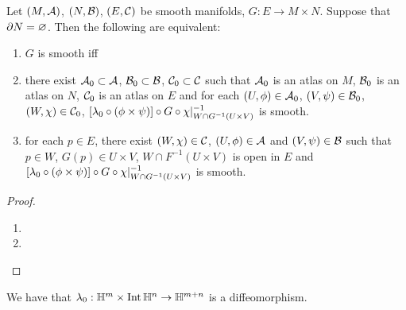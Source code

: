 \documentclass{book}
\begin{document}
\begin{ex} 
	Let $(M,\mathcal{A})$, $(N, \mathcal{B})$, $(E, \mathcal{C})$ be smooth manifolds, $G:E \rightarrow M \times N$. Suppose that $\partial N = \varnothing$. Then the following are equivalent:
	\begin{enumerate}
		\item $G$ is smooth iff 
		\item there exist $\mathcal{A}_0 \subset \mathcal{A}$, $\mathcal{B}_0 \subset \mathcal{B}$, $\mathcal{C}_0 \subset \mathcal{C}$ such that $\mathcal{A}_0$ is an atlas on $M$, $\mathcal{B}_0$ is an atlas on $N$, $\mathcal{C}_0$ is an atlas on $E$ and for each $(U, \phi) \in \mathcal{A}_0$, $(V, \psi) \in \mathcal{B}_0$, $(W, \chi) \in \mathcal{C}_0$, $[\lambda_0 \circ (\phi \times \psi)] \circ G \circ \chi|_{W \cap G^{-1}(U \times V)}^{-1}$ is smooth. 
		\item for each $p \in E$, there exist $(W, \chi) \in \mathcal{C}$, $(U, \phi) \in \mathcal{A}$ and $(V, \psi) \in \mathcal{B}$ such that $p \in W$, $G(p) \in U \times V$, $W \cap F^{-1}(U \times V)$ is open in $E$  and $[\lambda_0 \circ (\phi \times \psi)] \circ G \circ \chi|_{W \cap G^{-1}(U \times V)}^{-1}$ is smooth. 
	\end{enumerate}
\end{ex}

\begin{proof} \
	\begin{enumerate}
		\item {}
		\item 
	\end{enumerate}
\end{proof}

\begin{ex} 
	We have that $\lambda_0: \mathbb{H}^m \times \operatorname{Int} \mathbb{H}^n \rightarrow \mathbb{H}^{m+n}$ is a diffeomorphism. 
\end{ex}
\end{document}
